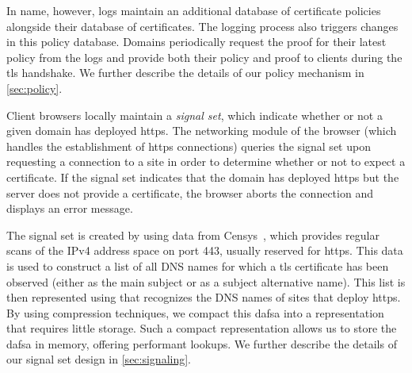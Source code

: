 In \ac{name}, however, logs maintain an additional database of certificate
policies alongside their database of certificates. The logging process also
triggers changes in this policy database. Domains periodically request the proof
for their latest policy from the logs and provide both their policy and proof to
clients during the \ac{tls} handshake. We further describe the details of our
policy mechanism in \autoref{sec:policy}.

Client browsers locally maintain a \emph{signal set}, which indicate whether or
not a given domain has deployed \ac{https}. The networking module of the browser
(which handles the establishment of \ac{https} connections) queries the signal
set upon requesting a connection to a site in order to determine whether or not
to expect a certificate. If the signal set indicates that the domain has
deployed \ac{https} but the server does not provide a certificate, the browser
aborts the connection and displays an error message.

The signal set is created by using data from Censys~\cite{durumeric2015search},
which provides regular scans of the IPv4 address space on port 443, usually
reserved for \ac{https}. This data is used to construct a list of all DNS names
for which a \ac{tls} certificate has been observed (either as the main subject
or as a subject alternative name). This list is then represented using
 that recognizes the DNS names of sites that deploy \ac{https}. By
using compression techniques, we compact this \ac{dafsa} into a representation
that requires little storage. Such a compact representation allows us to store
the \ac{dafsa} in memory, offering performant lookups. We further describe the
details of our signal set design in \autoref{sec:signaling}.


